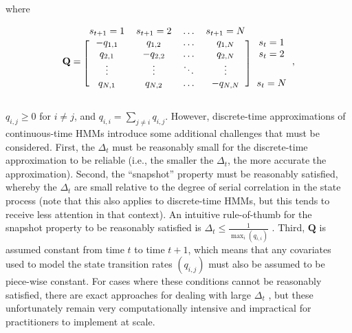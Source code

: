\documentclass[12pt]{article}\usepackage[]{graphicx}\usepackage[]{xcolor}
\begin{document}
where
\begin{linenomath*}
\begin{equation}
 \mathbf{Q} = \begin{blockarray}{ccccc}
    s_{t+1}=1 & s_{t+1}=2 & \hdots & s_{t+1}=N & \\
    \begin{block}{[cccc]c}
    -q_{1,1} & q_{1,2} & \hdots & q_{1,N} & s_t=1 \\
    q_{2,1} & -q_{2,2} & \hdots & q_{2,N} & s_t=2 \\
    \vdots & \vdots   & \ddots & \vdots  & \\
    q_{N,1} & q_{N,2} & \hdots & -q_{N,N} & s_t=N \\
    \end{block}
    \end{blockarray},
\end{equation}
\end{linenomath*}
$q_{i,j} \ge 0$ for $i \ne j$, and $q_{i,i}=\sum_{j \ne i} q_{i,j}$. However, discrete-time approximations of continuous-time HMMs introduce some additional challenges that must be considered. First, the $\Delta_t$ must be reasonably small for the discrete-time approximation to be reliable (i.e., the smaller the $\Delta_t$, the more accurate the approximation). Second, the ``snapshot'' property must be reasonably satisfied, whereby the $\Delta_t$ are small relative to the degree of serial correlation in the state process (note that this also applies to discrete-time HMMs, but this tends to receive less attention in that context). An intuitive rule-of-thumb for the snapshot property to be reasonably satisfied is $\Delta_t \le \frac{1}{\max_i\left(q_{i,i}\right)}$ \citep[][]{glennie2023hidden,McClintockLander2024}. Third, $\mathbf{Q}$ is assumed constant from time $t$ to time $t+1$, which means that any covariates used to model the state transition rates $\left(q_{i,j}\right)$ must also be assumed to be piece-wise constant. For cases where these conditions cannot be reasonably satisfied, there are exact approaches for dealing with large $\Delta_t$ \citep[e.g.,][]{BlackwellEtAl2016}, but these unfortunately remain very computationally intensive and impractical for practitioners to implement at scale.
%
\end{document}
